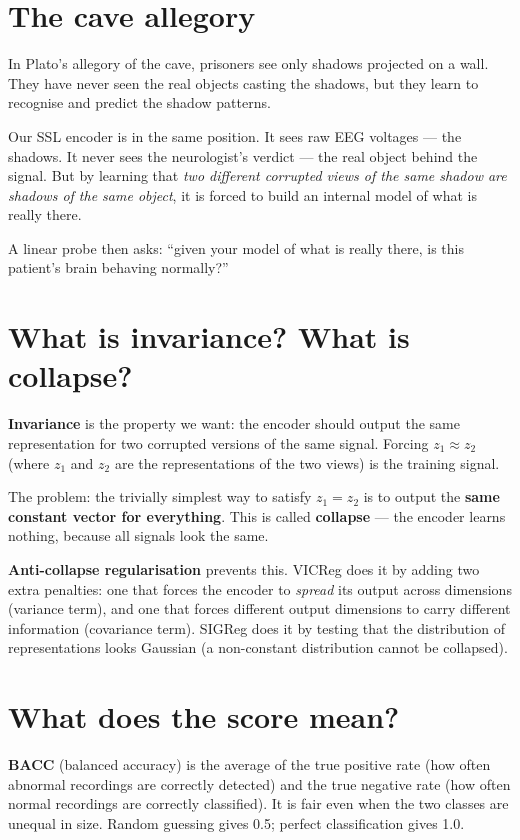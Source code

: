 \documentclass[11pt,a4paper]{article}
\begin{document}
\section*{The cave allegory}

In Plato's allegory of the cave, prisoners see only shadows projected on a
wall.  They have never seen the real objects casting the shadows, but they
learn to recognise and predict the shadow patterns.

Our SSL encoder is in the same position.  It sees raw EEG voltages — the
shadows.  It never sees the neurologist's verdict — the real object behind
the signal.  But by learning that \emph{two different corrupted views of the
same shadow are shadows of the same object}, it is forced to build an
internal model of what is really there.

A linear probe then asks: ``given your model of what is really there, is
this patient's brain behaving normally?''

\section*{What is invariance? What is collapse?}

\textbf{Invariance} is the property we want: the encoder should output the
same representation for two corrupted versions of the same signal.
Forcing $z_1 \approx z_2$ (where $z_1$ and $z_2$ are the representations
of the two views) is the training signal.

The problem: the trivially simplest way to satisfy $z_1 = z_2$ is to output
the \textbf{same constant vector for everything}.  This is called
\textbf{collapse} — the encoder learns nothing, because all signals look
the same.

\textbf{Anti-collapse regularisation} prevents this.  VICReg does it by
adding two extra penalties: one that forces the encoder to \emph{spread}
its output across dimensions (variance term), and one that forces different
output dimensions to carry different information (covariance term).
SIGReg does it by testing that the distribution of representations looks
Gaussian (a non-constant distribution cannot be collapsed).

\section*{What does the score mean?}

\textbf{BACC} (balanced accuracy) is the average of the true positive rate
(how often abnormal recordings are correctly detected) and the true negative
rate (how often normal recordings are correctly classified).  It is fair even
when the two classes are unequal in size.  Random guessing gives 0.5;
perfect classification gives 1.0.
\end{document}
